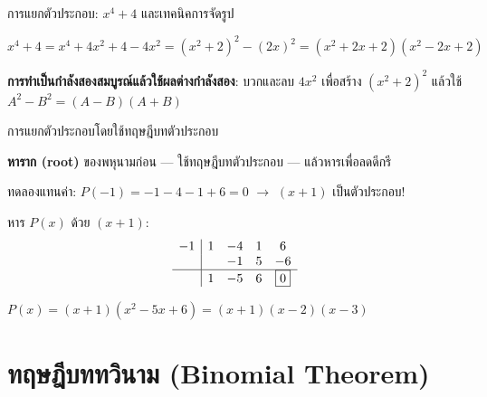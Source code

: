 \documentclass[11pt, aspectratio=169]{beamer}
\begin{document}
\begin{frame}{การแยกตัวประกอบ: $x^4+4$ และเทคนิคการจัดรูป}
  \begin{exambox}[เทคนิค: $x^4+4$]
    $x^4+4 = x^4 + 4x^2 + 4 - 4x^2 = (x^2+2)^2 - (2x)^2 = (x^2+2x+2)(x^2-2x+2)$
  \end{exambox}

  \begin{intuition}[แนวคิด]
    \textbf{การทำเป็นกำลังสองสมบูรณ์แล้วใช้ผลต่างกำลังสอง}:
    บวกและลบ $4x^2$ เพื่อสร้าง $(x^2+2)^2$ แล้วใช้ $A^2-B^2 = (A-B)(A+B)$
  \end{intuition}
\end{frame}

\begin{frame}{การแยกตัวประกอบโดยใช้ทฤษฎีบทตัวประกอบ}
  \begin{explanation}[แนวคิด]
    \textbf{หาราก (root)} ของพหุนามก่อน — ใช้ทฤษฎีบทตัวประกอบ — แล้วหารเพื่อลดดีกรี
  \end{explanation}

  \begin{exambox}
    ทดลองแทนค่า: $P(-1) = -1-4-1+6 = 0$ $\rightarrow$ $(x+1)$ เป็นตัวประกอบ!

    หาร $P(x)$ ด้วย $(x+1)$:
    \[
    \begin{array}{c|cccc}
      -1 & 1 & -4 & 1 & 6 \\
         &    & -1 & 5 & -6 \\
      \hline
         & 1 & -5 & 6 & \boxed{0}
    \end{array}
    \]

    $P(x) = (x+1)(x^2 - 5x + 6) = (x+1)(x-2)(x-3)$
  \end{exambox}
\end{frame}

\section{ทฤษฎีบททวินาม (Binomial Theorem)}
\end{document}

